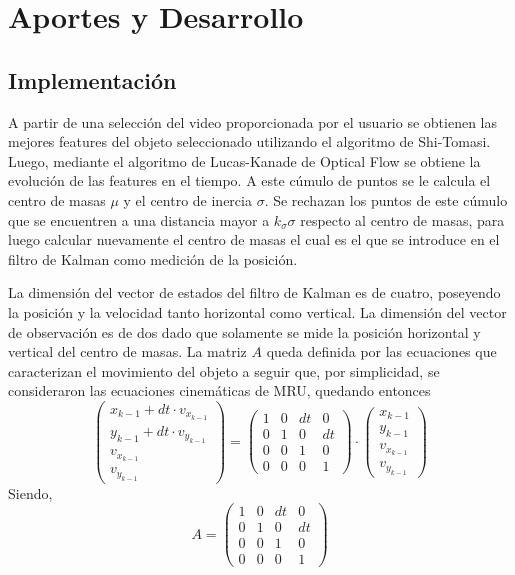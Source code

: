 \section{Aportes y Desarrollo}

\subsection{Implementación}
A partir de una selección del video proporcionada por el usuario se obtienen las mejores features del objeto seleccionado utilizando el algoritmo de Shi-Tomasi. Luego, mediante el algoritmo de Lucas-Kanade de Optical Flow se obtiene la evolución de las features en el tiempo. A este cúmulo de puntos se le calcula el centro de masas $\mu$ y el centro de inercia $\sigma$. Se rechazan los puntos de este cúmulo que se encuentren a una distancia mayor a $k_{\sigma}\sigma$ respecto al centro de masas, para luego calcular nuevamente el centro de masas el cual es el que se introduce en el filtro de Kalman como medición de la posición.

La dimensión del vector de estados del filtro de Kalman es de cuatro, poseyendo la posición y la velocidad tanto horizontal como vertical. La dimensión del vector de observación es de dos dado que solamente se mide la posición horizontal y vertical del centro de masas. La matriz $A$ queda definida por las ecuaciones que caracterizan el movimiento del objeto a seguir que, por simplicidad, se consideraron las ecuaciones cinemáticas de MRU, quedando entonces
\begin{equation}
\begin{pmatrix} x_{k-1} + dt\cdot v_{x_{k-1}} \\y_{k-1} + dt\cdot v_{y_{k-1}} \\ v_{x_{k-1}}  \\ v_{y_{k-1}} \end{pmatrix} =\begin{pmatrix}
1 & 0 & dt  & 0\\
0 & 1  & 0 & dt\\
0 & 0  & 1  & 0\\
0 & 0  & 0  & 1 
\end{pmatrix} \cdot \begin{pmatrix} x_{k-1}\\y_{k-1} \\ v_{x_{k-1}}  \\ v_{y_{k-1}} \end{pmatrix}
\end{equation}
Siendo, 
\begin{equation}
A = 
\begin{pmatrix}
1 & 0 & dt  & 0\\
0 & 1  & 0 & dt\\
0 & 0  & 1  & 0\\
0 & 0  & 0  & 1 
\end{pmatrix}
\end{equation}

